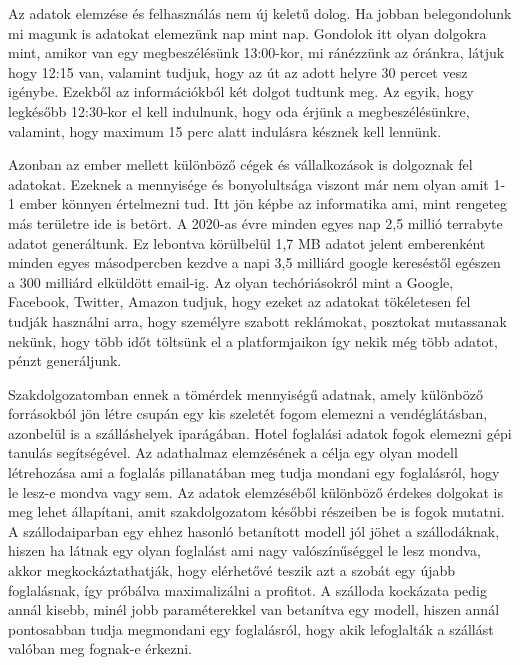 
Az adatok elemzése és felhasználás nem új keletű dolog. Ha jobban belegondolunk mi magunk is adatokat elemezünk nap mint nap. Gondolok itt olyan dolgokra mint, amikor van egy megbeszélésünk 13:00-kor, mi ránézzünk az óránkra, látjuk hogy 12:15 van, valamint tudjuk, hogy az út az adott helyre 30 percet vesz igénybe. Ezekből az információkból két dolgot tudtunk meg. Az egyik, hogy legkésőbb 12:30-kor el kell indulnunk, hogy oda érjünk a megbeszélésünkre, valamint, hogy maximum 15 perc alatt indulásra késznek kell lennünk.

Azonban az ember mellett különböző cégek és vállalkozások is dolgoznak fel adatokat. Ezeknek a mennyisége és bonyolultsága viszont már nem olyan amit 1-1 ember könnyen értelmezni tud. Itt jön képbe az informatika ami, mint rengeteg más területre ide is betört. A 2020-as évre minden egyes nap 2,5 millió terrabyte adatot generáltunk. Ez lebontva körülbelül 1,7 MB adatot jelent emberenként minden egyes másodpercben kezdve a napi 3,5 milliárd google kereséstől egészen a 300 milliárd elküldött email-ig. Az olyan techóriásokról mint a Google, Facebook, Twitter, Amazon tudjuk, hogy ezeket az adatokat tökéletesen fel tudják használni arra, hogy személyre szabott reklámokat, posztokat mutassanak nekünk, hogy több időt töltsünk el a platformjaikon így nekik még több adatot, pénzt generáljunk.

Szakdolgozatomban ennek a tömérdek mennyiségű adatnak, amely különböző forrásokból jön létre csupán egy kis szeletét fogom elemezni a vendéglátásban, azonbelül is a szálláshelyek iparágában. Hotel foglalási adatok fogok elemezni gépi tanulás segítségével. Az adathalmaz elemzésének a célja egy olyan modell létrehozása ami a foglalás pillanatában meg tudja mondani egy foglalásról, hogy le lesz-e mondva vagy sem. Az adatok elemzéséből különböző érdekes dolgokat is meg lehet állapítani, amit szakdolgozatom későbbi részeiben be is fogok mutatni. A szállodaiparban egy ehhez hasonló betanított modell jól jöhet a szállodáknak, hiszen ha látnak egy olyan foglalást ami nagy valószínűséggel le lesz mondva, akkor megkockáztathatják, hogy elérhetővé teszik azt a szobát egy újabb foglalásnak, így próbálva maximalizálni a profitot. A szálloda kockázata pedig annál kisebb, minél jobb paraméterekkel van betanítva egy modell, hiszen annál pontosabban tudja megmondani egy foglalásról, hogy akik lefoglalták a szállást valóban meg fognak-e érkezni.

